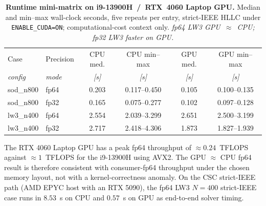 \begin{table}[htbp]
\centering
\small
\begin{tabular}{@{}llS[scientific-notation=false,table-format=1.3]cS[scientific-notation=false,table-format=1.3]c@{}}
\toprule
Case & Precision & {CPU med.} & CPU min--max & {GPU med.} & GPU min--max \\
\itshape config & \itshape mode & \itshape [s] & \itshape [s] & \itshape [s] & \itshape [s] \\
\midrule \addlinespace[2pt]
sod\_n800 & fp64 & 0.203 & 0.117--0.450 & 0.105 & 0.100--0.135 \\
sod\_n800 & fp32 & 0.165 & 0.075--0.277 & 0.102 & 0.097--0.128 \\
lw3\_n400 & fp64 & 2.554 & 2.039--3.299 & 2.651 & 2.500--3.199 \\
lw3\_n400 & fp32 & 2.717 & 2.418--4.306 & 1.873 & 1.827--1.939 \\
\bottomrule
\end{tabular}
\caption[Runtime mini-matrix]{\textbf{Runtime mini-matrix on i9-13900H~/~RTX~4060 Laptop GPU.}
  Median and min--max wall-clock seconds, five repeats per entry, strict-IEEE HLLC under \texttt{ENABLE\_CUDA=ON}; computational-cost context only.
  \emph{fp64 LW3 GPU~\(\approx\)~CPU; fp32 LW3 faster on GPU.}}
\label{tab:ch4-runtime-minimatrix}
\end{table}

The RTX 4060 Laptop GPU has a peak fp64 throughput of $\approx 0.24$~TFLOPS against $\approx 1$~TFLOPS for the i9-13900H using AVX2. The GPU $\approx$ CPU fp64 result is therefore consistent with consumer-fp64 throughput under the chosen memory layout, not with a kernel-correctness anomaly. On the CSC strict-IEEE path (AMD EPYC host with an RTX 5090), the fp64 LW3 $N=400$ strict-IEEE case runs in $8.53$~s on CPU and $0.57$~s on GPU as end-to-end solver timing.


